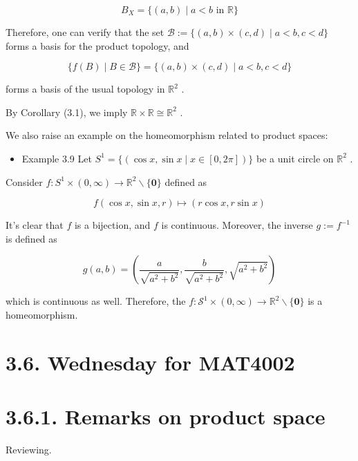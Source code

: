 \[
{B}_{X} = \{ \left( {a,b}\right)  \mid  a < b\text{ in }\mathbb{R}\}
\]

Therefore, one can verify that the set \(\mathcal{B} \mathrel{\text{ := }} \{ \left( {a,b}\right)  \times  \left( {c,d}\right)  \mid  a < b,c < d\}\) forms a basis for the product topology, and

\[
\{ f\left( B\right)  \mid  B \in  \mathcal{B}\}  = \{ \left( {a,b}\right)  \times  \left( {c,d}\right)  \mid  a < b,c < d\}
\]

forms a basis of the usual topology in \({\mathbb{R}}^{2}\) .

By Corollary (3.1), we imply \(\mathbb{R} \times  \mathbb{R} \cong  {\mathbb{R}}^{2}\) .

We also raise an example on the homeomorphism related to product spaces:

\begin{itemize}
\item Example 3.9 Let \({S}^{1} = \{ \left( {\cos x,\sin x \mid  x \in  \left\lbrack  {0,{2\pi }}\right\rbrack  }\right) \}\) be a unit circle on \({\mathbb{R}}^{2}\) .
\end{itemize}

Consider \(f : {S}^{1} \times  \left( {0,\infty }\right)  \rightarrow  {\mathbb{R}}^{2} \smallsetminus  \{ \mathbf{0}\}\) defined as

\[
f\left( {\cos x,\sin x,r}\right)  \mapsto  \left( {r\cos x,r\sin x}\right)
\]

It’s clear that \(f\) is a bijection, and \(f\) is continuous. Moreover, the inverse \(g \mathrel{\text{ := }} {f}^{-1}\) is defined as

\[
g\left( {a,b}\right)  = \left( {\frac{a}{\sqrt{{a}^{2} + {b}^{2}}},\frac{b}{\sqrt{{a}^{2} + {b}^{2}}},\sqrt{{a}^{2} + {b}^{2}}}\right)
\]

which is continuous as well. Therefore, the \(f : {\mathcal{S}}^{1} \times  \left( {0,\infty }\right)  \rightarrow  {\mathbb{R}}^{2} \smallsetminus  \{ \mathbf{0}\}\) is a homeomorphism.

\section*{3.6. Wednesday for MAT4002}

\section*{3.6.1. Remarks on product space}

Reviewing.

